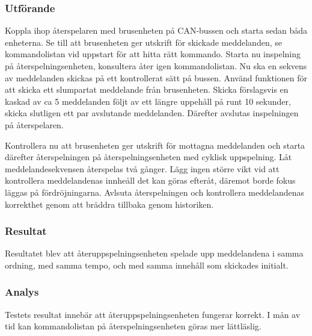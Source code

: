\subsubsection*{Utförande}
Koppla ihop återspelaren med brusenheten på CAN-bussen och starta sedan båda enheterna.
Se till att brusenheten ger utskrift för skickade meddelanden, se kommandolistan vid uppstart för att hitta rätt kommando.
Starta nu inspelning på återspelningsenheten, konsultera åter igen kommandolistan.
Nu ska en sekvens av meddelanden skickas på ett kontrollerat sätt på bussen.
Använd funktionen för att skicka ett slumpartat meddelande från brusenheten.
Skicka förslagsvis en kaskad av  ca 5 meddelanden följt av ett längre uppehåll på runt 10 sekunder, skicka slutligen ett par avslutande meddelanden.
Därefter avslutas inspelningen på återspelaren.

Kontrollera nu att brusenheten ger utskrift för mottagna meddelanden och starta därefter återspelningen på återspelningsenheten med cyklisk uppspelning.
Låt meddelandesekvensen återspelas två gånger.
Lägg ingen större vikt vid att kontrollera meddelandenas innheåll det kan göras efteråt, däremot borde fokus läggas på fördröjningarna.
Avlsuta återspelningen och kontrollera meddelandenas korrekthet genom att bräddra tillbaka genom historiken.


\subsubsection*{Resultat}
Resultatet blev att återuppspelningsenheten spelade upp meddelandena i samma ordning, med samma tempo, och med samma innehåll som skickades initialt.



\subsubsection*{Analys}
Testets resultat innebär att återuppspelningsenheten fungerar korrekt. I mån av tid kan kommandolistan på återspelningsenheten göras mer lättläslig.


